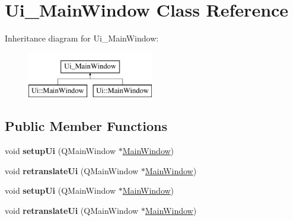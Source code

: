 \hypertarget{class_ui___main_window}{\section{Ui\-\_\-\-Main\-Window Class Reference}
\label{class_ui___main_window}
}
Inheritance diagram for Ui\-\_\-\-Main\-Window\-:\begin{figure}[H]
\begin{center}
\leavevmode
\includegraphics[height=2.000000cm]{class_ui___main_window}
\end{center}
\end{figure}
\subsection*{Public Member Functions}
\begin{DoxyCompactItemize}
\item 
\hypertarget{class_ui___main_window_acf4a0872c4c77d8f43a2ec66ed849b58}{void {\bfseries setup\-Ui} (Q\-Main\-Window $\ast$\hyperlink{class_main_window}{Main\-Window})}\label{class_ui___main_window_acf4a0872c4c77d8f43a2ec66ed849b58}

\item 
\hypertarget{class_ui___main_window_a097dd160c3534a204904cb374412c618}{void {\bfseries retranslate\-Ui} (Q\-Main\-Window $\ast$\hyperlink{class_main_window}{Main\-Window})}\label{class_ui___main_window_a097dd160c3534a204904cb374412c618}

\item 
\hypertarget{class_ui___main_window_acf4a0872c4c77d8f43a2ec66ed849b58}{void {\bfseries setup\-Ui} (Q\-Main\-Window $\ast$\hyperlink{class_main_window}{Main\-Window})}\label{class_ui___main_window_acf4a0872c4c77d8f43a2ec66ed849b58}

\item 
\hypertarget{class_ui___main_window_a097dd160c3534a204904cb374412c618}{void {\bfseries retranslate\-Ui} (Q\-Main\-Window $\ast$\hyperlink{class_main_window}{Main\-Window})}\label{class_ui___main_window_a097dd160c3534a204904cb374412c618}

\end{DoxyCompactItemize}
